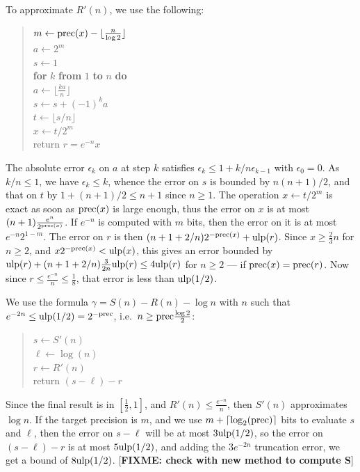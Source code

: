 \documentclass[12pt]{amsart}
\def\q{\hspace*{5mm}}
\def\ulp{{\rm ulp}}
\def\Paragraph#1{\noindent {\sc #1}}
\begin{document}
To approximate $R'(n)$, we use the following:
\begin{quote}
$m \leftarrow {\rm prec}(x) - \lfloor \frac{n}{\log 2} \rfloor$ \\
$a \leftarrow 2^m$ \\
$s \leftarrow 1$ \\
{\bf for} $k$ {\bf from} $1$ {\bf to} $n$ {\bf do} \\
\q $a \leftarrow \lfloor \frac{k a}{n} \rfloor$ \\
\q $s \leftarrow s + (-1)^{k} a$ \\
$t \leftarrow \lfloor s/n \rfloor$ \\
$x \leftarrow t/2^m$ \\
return $r = e^{-n} x$
\end{quote}
The absolute error $\epsilon_k$ on $a$ at step $k$ satisfies
$\epsilon_k \le 1 + k/n \epsilon_{k-1}$ with $\epsilon_0=0$.
As $k/n \le 1$, we have $\epsilon_k \le k$, whence the error
on $s$ is bounded by $n(n+1)/2$, and that on $t$ by
$1 + (n+1)/2 \le n+1$ since $n \ge 1$.
The operation $x \leftarrow t/2^m$ is exact as soon as ${\rm prec}(x)$ is large
enough, thus the error on $x$ is at most $(n+1) \frac{e^n}{2^{{\rm prec}(x)}}$.
If $e^{-n}$ is computed with $m$ bits, then
the error on it is at most $e^{-n} 2^{1-m}$.
The error on $r$ is then $(n + 1 + 2/n) 2^{-{\rm prec}(x)} +
\ulp(r)$.
Since $x \ge \frac{2}{3} n$ for $n \ge 2$, and $x 2^{-{\rm prec}(x)}
< \ulp(x)$, this gives an error bounded by
$\ulp(r) + (n + 1 + 2/n) \frac{3}{2n} \ulp(r)
\le 4 \ulp(r)$ for $n \ge 2$ --- if ${\rm prec}(x) = {\rm prec}(r)$.
Now since $r \le \frac{e^{-n}}{n} \le \frac{1}{8}$, that error
is less than $\ulp(1/2)$.

\medskip

\Paragraph{Final computation.} We use the formula
$\gamma = S(n) - R(n) - \log n$ with $n$ such that $e^{-2n} \le
\ulp(1/2) = 2^{-{\rm prec}}$, i.e.\ $n \ge {\rm prec} \frac{\log 2}{2}$:
\begin{quote}
$s \leftarrow S'(n)$ \\
$\ell \leftarrow \log(n)$ \\
$r \leftarrow R'(n)$ \\
return $(s - \ell) - r$
\end{quote}
Since the final result is in $[\frac{1}{2}, 1]$, and $R'(n) \le
\frac{e^{-n}}{n}$, then $S'(n)$ approximates $\log n$.
If the target precision is $m$, and
we use $m + \lceil \log_2({\rm prec}) \rceil$ bits to evaluate $s$ and $\ell$,
then the error on $s-\ell$ will be at most $3 \ulp(1/2)$,
so the error on $(s - \ell) - r$ is at most $5 \ulp(1/2)$,
and adding the $3 e^{-2n}$ truncation error, we get a bound of
$8 \ulp(1/2)$.
[\textbf{FIXME: check with new method to compute S}]
\end{document}
